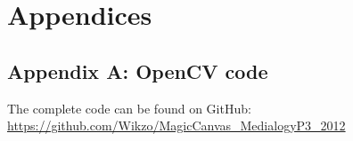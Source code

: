 \chapter{Appendices}
\section{Appendix A: OpenCV code}\label{appendixCode}
%

The complete code can be found on GitHub: \url{https://github.com/Wikzo/MagicCanvas_MedialogyP3_2012}